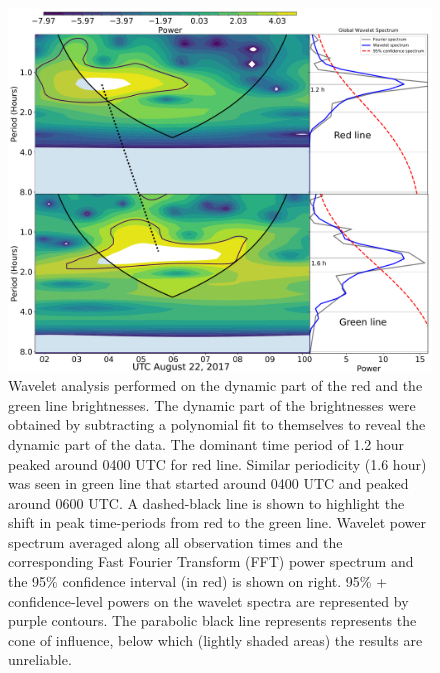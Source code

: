 \begin{figure}
 \centering\includegraphics[width=35pc]{wavelet_red_green.pdf}
 \caption{Wavelet analysis performed on the dynamic part of the red and the green line brightnesses. The dynamic part of the brightnesses were obtained by subtracting a polynomial fit to themselves to reveal the dynamic part of the data. The dominant time period of 1.2 hour peaked around 0400 UTC for red line. Similar periodicity (1.6 hour) was seen in green line that  started around 0400 UTC and peaked around 0600 UTC. A dashed-black line is shown to highlight the shift in peak time-periods from red to the green line. Wavelet power spectrum averaged along all observation times and the corresponding Fast Fourier Transform (FFT) power spectrum and the 95$\%$ confidence interval (in red) is shown on right. 95\% + confidence-level powers on the wavelet spectra are represented by purple contours. The parabolic black line represents represents the cone of influence, below which (lightly shaded areas) the results are unreliable.}
 \label{fig:red_green_wv}
 \end{figure}
